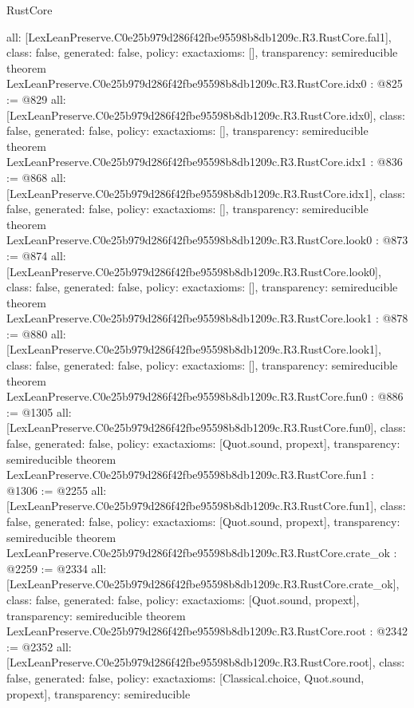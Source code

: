\begin{lexlean}{RustCore}
\begin{coremodule}
{  all: [LexLeanPreserve.C0e25b979d286f42fbe95598b8db1209c.R3.RustCore.fal1],
  class: false,
  generated: false,
  policy: exact{axioms: []},
  transparency: semireducible
}
theorem LexLeanPreserve.C0e25b979d286f42fbe95598b8db1209c.R3.RustCore.idx0 : @825 := @829 {
  all: [LexLeanPreserve.C0e25b979d286f42fbe95598b8db1209c.R3.RustCore.idx0],
  class: false,
  generated: false,
  policy: exact{axioms: []},
  transparency: semireducible
}
theorem LexLeanPreserve.C0e25b979d286f42fbe95598b8db1209c.R3.RustCore.idx1 : @836 := @868 {
  all: [LexLeanPreserve.C0e25b979d286f42fbe95598b8db1209c.R3.RustCore.idx1],
  class: false,
  generated: false,
  policy: exact{axioms: []},
  transparency: semireducible
}
theorem LexLeanPreserve.C0e25b979d286f42fbe95598b8db1209c.R3.RustCore.look0 : @873 := @874 {
  all: [LexLeanPreserve.C0e25b979d286f42fbe95598b8db1209c.R3.RustCore.look0],
  class: false,
  generated: false,
  policy: exact{axioms: []},
  transparency: semireducible
}
theorem LexLeanPreserve.C0e25b979d286f42fbe95598b8db1209c.R3.RustCore.look1 : @878 := @880 {
  all: [LexLeanPreserve.C0e25b979d286f42fbe95598b8db1209c.R3.RustCore.look1],
  class: false,
  generated: false,
  policy: exact{axioms: []},
  transparency: semireducible
}
theorem LexLeanPreserve.C0e25b979d286f42fbe95598b8db1209c.R3.RustCore.fun0 : @886 := @1305 {
  all: [LexLeanPreserve.C0e25b979d286f42fbe95598b8db1209c.R3.RustCore.fun0],
  class: false,
  generated: false,
  policy: exact{axioms: [Quot.sound, propext]},
  transparency: semireducible
}
theorem LexLeanPreserve.C0e25b979d286f42fbe95598b8db1209c.R3.RustCore.fun1 : @1306 := @2255 {
  all: [LexLeanPreserve.C0e25b979d286f42fbe95598b8db1209c.R3.RustCore.fun1],
  class: false,
  generated: false,
  policy: exact{axioms: [Quot.sound, propext]},
  transparency: semireducible
}
theorem LexLeanPreserve.C0e25b979d286f42fbe95598b8db1209c.R3.RustCore.crate_ok : @2259 := @2334 {
  all: [LexLeanPreserve.C0e25b979d286f42fbe95598b8db1209c.R3.RustCore.crate_ok],
  class: false,
  generated: false,
  policy: exact{axioms: [Quot.sound, propext]},
  transparency: semireducible
}
theorem LexLeanPreserve.C0e25b979d286f42fbe95598b8db1209c.R3.RustCore.root : @2342 := @2352 {
  all: [LexLeanPreserve.C0e25b979d286f42fbe95598b8db1209c.R3.RustCore.root],
  class: false,
  generated: false,
  policy: exact{axioms: [Classical.choice, Quot.sound, propext]},
  transparency: semireducible
}


\end{coremodule}
\end{lexlean}
